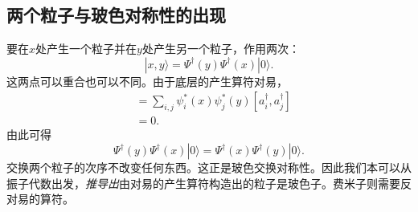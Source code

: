 \begin{classroomqa}
\end{classroomqa}

\subsection{两个粒子与玻色对称性的出现}

要在\(x\)处产生一个粒子并在\(y\)处产生另一个粒子，作用两次：
\begin{equation}
|x,y\rangle
=\Psi^\dagger(y)\Psi^\dagger(x)|0\rangle.
\label{eq:l06-two-particle-state}
\end{equation}
这两点可以重合也可以不同。由于底层的产生算符对易，
\begin{align}
[\Psi^\dagger(x),\Psi^\dagger(y)]
&=\sum_{i,j}\psi_i^*(x)\psi_j^*(y)
[a_i^\dagger,a_j^\dagger] \\
&=0.
\end{align}
由此可得
\begin{equation}
\Psi^\dagger(y)\Psi^\dagger(x)|0\rangle
=\Psi^\dagger(x)\Psi^\dagger(y)|0\rangle.
\label{eq:l06-boson-exchange}
\end{equation}
交换两个粒子的次序不改变任何东西。这正是玻色交换对称性。因此我们本可以从振子代数出发，\emph{推导出}由对易的产生算符构造出的粒子是玻色子。费米子则需要反对易的算符。

\begin{classroomqa}
\end{classroomqa}

\begin{classroomqa}
\end{classroomqa}

\begin{classroomqa}
\end{classroomqa}

